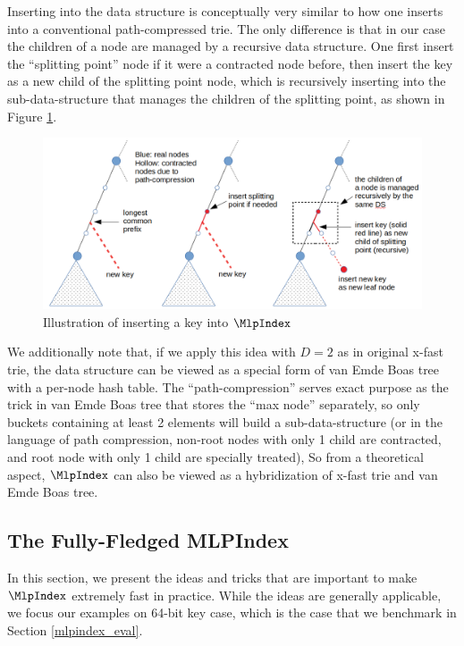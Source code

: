 \documentclass[11pt, usletter]{article}
\begin{document}
Inserting into the data structure is conceptually very similar to how one inserts into a conventional 
path-compressed trie.
The only difference is that in our case the children of a node are managed by a recursive data structure. 
One first insert the ``splitting point'' node if it were a contracted node before,  
then insert the key as a new child of the splitting point node, 
which is recursively inserting into the sub-data-structure that manages the children of the splitting point, 
as shown in Figure \ref{mlpindex_insert}.

\begin{figure}[!htb]
  \includegraphics[width=\linewidth]{mlpindex_insert.png}
\caption{Illustration of inserting a key into $\MlpIndex$}
\label{mlpindex_insert}
\end{figure}

We additionally note that, if we apply this idea with $D=2$ as in original x-fast trie, 
the data structure can be viewed as a special form of van Emde Boas tree \cite{vebtree} with a per-node hash table.
The ``path-compression'' serves exact purpose as the trick in van Emde Boas tree that stores the ``max node'' separately, 
so only buckets containing at least 2 elements will build a sub-data-structure 
(or in the language of path compression, non-root nodes with only 1 child are contracted, 
and root node with only 1 child are specially treated), 
So from a theoretical aspect, $\MlpIndex$ can also be viewed as a hybridization of x-fast trie and van Emde Boas tree.

\subsection{The Fully-Fledged MLPIndex} \label{mlpindex}

In this section, we present the ideas and tricks that are important to make $\MlpIndex$ 
extremely fast in practice. While the ideas are generally applicable, 
we focus our examples on 64-bit key case, which is the case that we benchmark in Section \ref{mlpindex_eval}.
\end{document}
